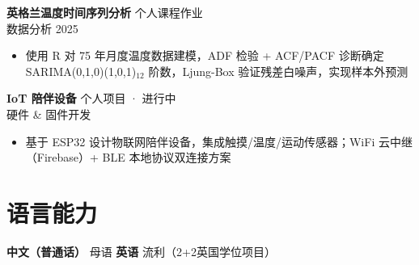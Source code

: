 \documentclass[a4paper,10pt]{article}
\newcommand{\projectentry}[4]{%
  \vspace{1pt}
  \noindent\textbf{#1} \hfill {\small\color{lightgray}#2}\\[-3pt]
  {\small\color{accent}#3} \hfill {\small #4}
  \vspace{0pt}
}
\begin{document}
\projectentry{英格兰温度时间序列分析}{个人课程作业}{数据分析}{2025}

\begin{itemize}
  \item 使用 R 对 75 年月度温度数据建模，ADF 检验 + ACF/PACF 诊断确定 SARIMA(0,1,0)(1,0,1)$_{12}$ 阶数，Ljung-Box 验证残差白噪声，实现样本外预测
\end{itemize}

\projectentry{IoT 陪伴设备}{个人项目 · 进行中}{硬件 \& 固件开发}{}

\begin{itemize}
  \item 基于 ESP32 设计物联网陪伴设备，集成触摸/温度/运动传感器；WiFi 云中继（Firebase）+ BLE 本地协议双连接方案
\end{itemize}


\section*{语言能力}
\vspace{-2pt}
{\small \textbf{中文（普通话）} 母语 \qquad \textbf{英语} 流利（2+2英国学位项目）}
\end{document}

